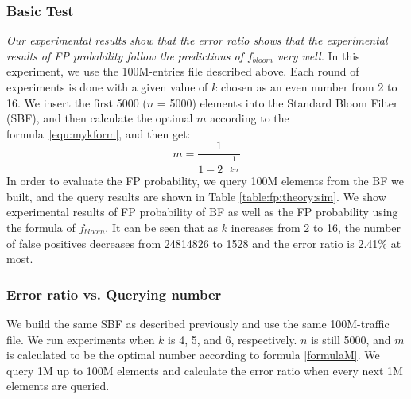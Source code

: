   






\subsubsection{Basic Test} \textit{Our experimental results show that the error ratio shows that the experimental results of FP probability follow the predictions of $f_{bloom}$ very well.}
In this experiment, we use the 100M-entries file described above. Each round of experiments is done with a given value of $k$ chosen as an even number from 2 to 16.
We insert the first 5000 ($n$ = 5000) elements into the Standard Bloom Filter (SBF), and then calculate the optimal $m$ according to the formula~\ref{equ:mykform}, and then get:
\begin{equation}
\label{formulaM}
m=\dfrac{1}{1-2^{-\dfrac{1}{kn}}}
\end{equation}
In order to evaluate the FP probability, we query 100M elements from the BF we built, and the query results are shown in Table \ref{table:fp:theory:sim}.
%
We show experimental results of FP probability of BF as well as the FP probability using the formula of $f_{bloom}$.
It can be seen that as $k$ increases from 2 to 16, the number of false positives decreases from 24814826 to 1528 and the error ratio is 2.41\% at most.




 \subsubsection{Error ratio vs. Querying number}

 
  
  
 We build the same SBF as described previously and use the same 100M-traffic file. We run experiments when $k$ is 4, 5, and 6, respectively. $n$ is still 5000, and $m$ is calculated to be the optimal number according to formula \ref{formulaM}. We query 1M up to 100M elements and calculate the error ratio when every next 1M elements are queried.



